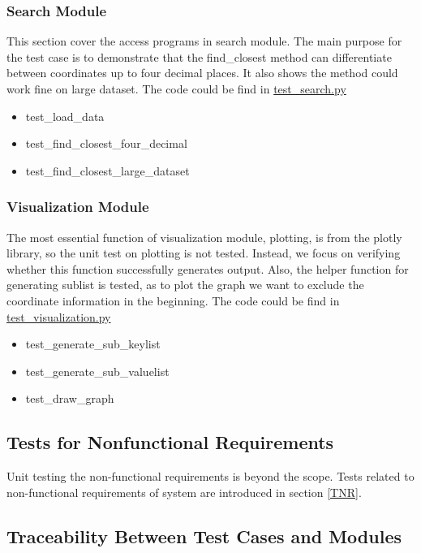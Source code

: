 \documentclass[12pt, titlepage]{article}
\begin{document}
\subsubsection{Search Module} \label{SM}
This section cover the access programs in search module. The main purpose for the test case is to demonstrate that the find\_closest method can differentiate between coordinates up to four decimal places. It also shows the method could work fine on large dataset. The code could be find in \href{https://github.com/CynthiaLiu0805/BridgeCorrosion/blob/main/src/app/test_search.py}{test\_search.py}
\begin{itemize}
\item test\_load\_data
\item test\_find\_closest\_four\_decimal
\item test\_find\_closest\_large\_dataset
\end{itemize}

\subsubsection{Visualization Module} \label{VM}
The most essential function of visualization module, plotting, is from the plotly library, so the unit test on plotting is not tested. Instead, we focus on verifying whether this function successfully generates output. Also, the helper function for generating sublist is tested, as to plot the graph we want to exclude the coordinate information in the beginning. The code could be find in \href{https://github.com/CynthiaLiu0805/BridgeCorrosion/blob/main/src/app/test_visualization.py}{test\_visualization.py}
\begin{itemize}
\item test\_generate\_sub\_keylist
\item test\_generate\_sub\_valuelist
\item test\_draw\_graph
\end{itemize}


\subsection{Tests for Nonfunctional Requirements}
Unit testing the non-functional requirements is beyond the scope. Tests related to non-functional requirements of system are introduced in section \ref{TNR}.

\subsection{Traceability Between Test Cases and Modules}
\end{document}
